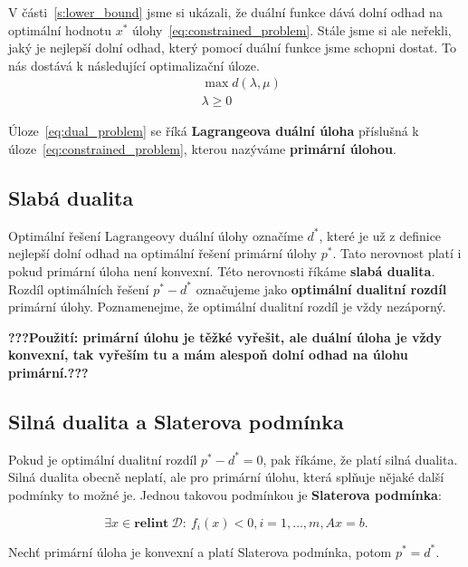 V části~\ref{s:lower_bound} jsme si ukázali, že duální funkce dává dolní odhad na optimální hodnotu $x^*$ úlohy~\ref{eq:constrained_problem}. Stále jsme si ale neřekli, jaký je nejlepší dolní odhad, který pomocí duální funkce jsme schopni dostat. To nás dostává k následující optimalizační úloze.
\begin{equation}\label{eq:dual_problem}
    \begin{split}
        &\max d(\lambda, \mu) \\
        &\lambda \geq 0
    \end{split}
\end{equation}

Úloze~\ref{eq:dual_problem} se říká \textbf{Lagrangeova duální úloha} příslušná k úloze~\ref{eq:constrained_problem}, kterou nazýváme \textbf{primární úlohou}.

\subsection{Slabá dualita}

Optimální řešení Lagrangeovy duální úlohy označíme $d^*$, které je už z definice nejlepší dolní odhad na optimální řešení primární úlohy $p^*$. Tato nerovnost platí i pokud primární úloha není konvexní. Této nerovnosti říkáme \textbf{slabá dualita}. Rozdíl optimálních řešení $p^* - d^*$ označujeme jako \textbf{optimální dualitní rozdíl} primární úlohy. Poznamenejme, že optimální dualitní rozdíl je vždy nezáporný.

\textbf{???Použití: primární úlohu je těžké vyřešit, ale duální úloha je vždy konvexní, tak vyřeším tu a mám alespoň dolní odhad na úlohu primární.???}

\subsection{Silná dualita a Slaterova podmínka}

Pokud je optimální dualitní rozdíl $p^* - d^* = 0$, pak říkáme, že platí silná dualita. Silná dualita obecně neplatí, ale pro primární úlohu, která splňuje nějaké další podmínky to možné je. Jednou takovou podmínkou je \textbf{Slaterova podmínka}:

\begin{equation}
    \exists x \in \textbf{relint}\ \mathcal{D}:\ f_i(x) < 0, i = 1, \dots, m, Ax = b.
\end{equation}

\begin{vt}
    Nechť primární úloha je konvexní a platí Slaterova podmínka, potom $p^* = d^*$.
\end{vt}
